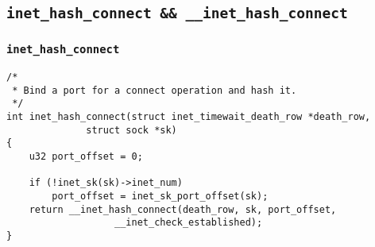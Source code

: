     \subsection{\texttt{inet_hash_connect && __inet_hash_connect}}

        \subsubsection{\texttt{inet_hash_connect}}
\begin{verbatim}
/*
 * Bind a port for a connect operation and hash it.
 */
int inet_hash_connect(struct inet_timewait_death_row *death_row,
              struct sock *sk)
{
    u32 port_offset = 0;

    if (!inet_sk(sk)->inet_num)
        port_offset = inet_sk_port_offset(sk);
    return __inet_hash_connect(death_row, sk, port_offset,
                   __inet_check_established);
}
\end{verbatim}

